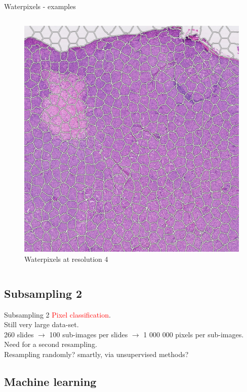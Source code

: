 \documentclass{beamer}
\begin{document}
\begin{frame}{Waterpixels - examples}
\begin{columns}[T]
\begin{column}{.3\textwidth}
\begin{figure}[!ht]
\centering
\includegraphics[width=\textwidth]{waterpix_res4.png}
\caption{Waterpixels at resolution 4}
\label{}
\end{figure}
\end{column}%

\end{columns}
\end{frame}

\subsection{Subsampling 2}
\begin{frame}{Subsampling 2}
\textcolor{red}{Pixel classification}. \\
Still very large data-set. \\
260 slides $\rightarrow$ 100 sub-images per slides $\rightarrow$ 1 000 000 pixels per sub-images. \\
Need for a second resampling. \\
Resampling randomly? smartly, via unsupervised methods?
\end{frame}

\subsection{Machine learning}
\end{document}
